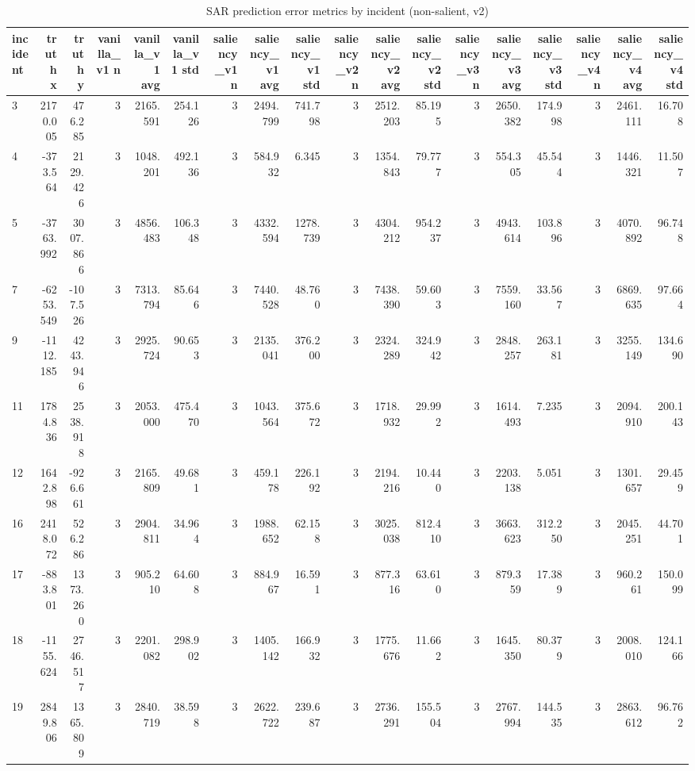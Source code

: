 \begin{table}[ht]
\centering
\caption{SAR prediction error metrics by incident (non-salient, v2)}
\label{tab:sar-incident-errors-non-salient,-v2}
\begin{tabular}{lrrrrrrrrrrrrrrrrr}
\hline
incident & truth x & truth y & vanilla\_v1 n & vanilla\_v1 avg & vanilla\_v1 std & saliency\_v1 n & saliency\_v1 avg & saliency\_v1 std & saliency\_v2 n & saliency\_v2 avg & saliency\_v2 std & saliency\_v3 n & saliency\_v3 avg & saliency\_v3 std & saliency\_v4 n & saliency\_v4 avg & saliency\_v4 std \\
\hline
3 & 2170.005 & 476.285 & 3 & 2165.591 & 254.126 & 3 & 2494.799 & 741.798 & 3 & 2512.203 & 85.195 & 3 & 2650.382 & 174.998 & 3 & 2461.111 & 16.708 \\
4 & -373.564 & 2129.426 & 3 & 1048.201 & 492.136 & 3 & 584.932 & 6.345 & 3 & 1354.843 & 79.777 & 3 & 554.305 & 45.544 & 3 & 1446.321 & 11.507 \\
5 & -3763.992 & 3007.866 & 3 & 4856.483 & 106.348 & 3 & 4332.594 & 1278.739 & 3 & 4304.212 & 954.237 & 3 & 4943.614 & 103.896 & 3 & 4070.892 & 96.748 \\
7 & -6253.549 & -107.526 & 3 & 7313.794 & 85.646 & 3 & 7440.528 & 48.760 & 3 & 7438.390 & 59.603 & 3 & 7559.160 & 33.567 & 3 & 6869.635 & 97.664 \\
9 & -1112.185 & 4243.946 & 3 & 2925.724 & 90.653 & 3 & 2135.041 & 376.200 & 3 & 2324.289 & 324.942 & 3 & 2848.257 & 263.181 & 3 & 3255.149 & 134.690 \\
11 & 1784.836 & 2538.918 & 3 & 2053.000 & 475.470 & 3 & 1043.564 & 375.672 & 3 & 1718.932 & 29.992 & 3 & 1614.493 & 7.235 & 3 & 2094.910 & 200.143 \\
12 & 1642.898 & -926.661 & 3 & 2165.809 & 49.681 & 3 & 459.178 & 226.192 & 3 & 2194.216 & 10.440 & 3 & 2203.138 & 5.051 & 3 & 1301.657 & 29.459 \\
16 & 2418.072 & 526.286 & 3 & 2904.811 & 34.964 & 3 & 1988.652 & 62.158 & 3 & 3025.038 & 812.410 & 3 & 3663.623 & 312.250 & 3 & 2045.251 & 44.701 \\
17 & -883.801 & 1373.260 & 3 & 905.210 & 64.608 & 3 & 884.967 & 16.591 & 3 & 877.316 & 63.610 & 3 & 879.359 & 17.389 & 3 & 960.261 & 150.099 \\
18 & -1155.624 & 2746.517 & 3 & 2201.082 & 298.902 & 3 & 1405.142 & 166.932 & 3 & 1775.676 & 11.662 & 3 & 1645.350 & 80.379 & 3 & 2008.010 & 124.166 \\
19 & 2849.806 & 1365.809 & 3 & 2840.719 & 38.598 & 3 & 2622.722 & 239.687 & 3 & 2736.291 & 155.504 & 3 & 2767.994 & 144.535 & 3 & 2863.612 & 96.762 \\

\end{tabular}
\end{table}
